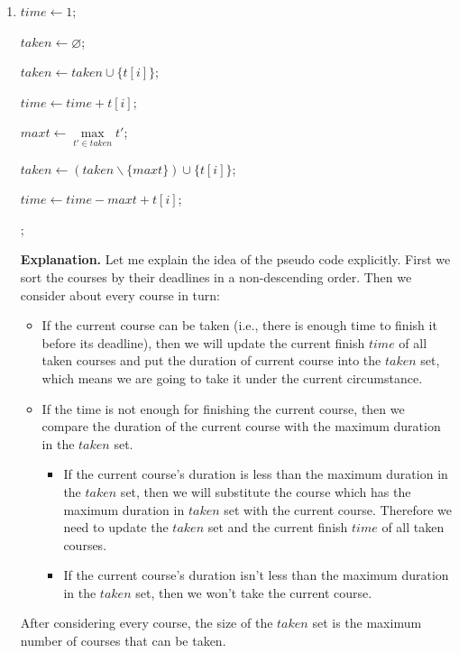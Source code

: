 \documentclass[12pt,a4paper]{article}
\makeatletter
\newtheorem*{solution}{Solution}
\theoremstyle{definition}
\renewenvironment{solution}[1][Solution] {\par\pushQED{\qed}\normalfont\topsep6\p@\@plus6\p@\relax\trivlist\item[\hskip\labelsep\bfseries#1\@addpunct{.}]\ignorespaces}{\popQED\endtrivlist\@endpefalse} \makeatother
\makeatother
\begin{document}
\begin{enumerate}
\begin{solution}
\begin{minipage}[t]{0.8\textwidth}
\begin{algorithm}[H]
            $time \leftarrow 1$;

            $taken \leftarrow \varnothing$; \quad {}

             {
                {
                    $taken \leftarrow taken \cup \{t[i]\}$;

                    $time \leftarrow time + t[i]$;
               }  {
                    $maxt \leftarrow \max\limits_{t' \in taken}{t'}$;

                     {
                        $taken \leftarrow (taken \backslash \{maxt\}) \cup \{t[i]\}$;

                        $time \leftarrow time - maxt + t[i]$;
                    }
                 }
            }
            ;  \quad {}
        \end{algorithm}
        \end{minipage}

        \textbf{\color{red}Explanation.} Let me explain the idea of the pseudo code explicitly. First we sort the courses by their deadlines in a non-descending order. Then we consider about every course in turn:
        \begin{itemize}
        \item If the current course can be taken (i.e., there is enough time to finish it before its deadline), then we will update the current finish $time$ of all taken courses and put the duration of current course into the $taken$ set, which means we are going to take it under the current circumstance.
        \item If the time is not enough for finishing the current course, then we compare the duration of the current course with the maximum duration in the $taken$ set.
        \begin{itemize}
        \item If the current course's duration is less than the maximum duration in the $taken$ set, then we will substitute the course which has the maximum duration in $taken$ set with the current course. Therefore we need to update the $taken$ set and the current finish $time$ of all taken courses.
        \item If the current course's duration isn't less than the maximum duration in the $taken$ set, then we won't take the current course.
        \end{itemize}
        \end{itemize}
        After considering every course, the size of the $taken$ set is the maximum number of courses that can be taken.


\end{solution}
\end{enumerate}
\end{document}
